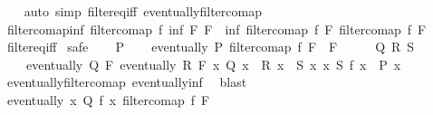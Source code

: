 \begin{isabellebody}
%
\isadelimproof
\ \ %
\endisadelimproof
%
\isatagproof
{}\isamarkupfalse%
\ {\isacharparenleft}{\kern0pt}auto\ simp{\isacharcolon}{\kern0pt}\ filter{\isacharunderscore}{\kern0pt}eq{\isacharunderscore}{\kern0pt}iff\ eventually{\isacharunderscore}{\kern0pt}filtercomap{\isacharparenright}{\kern0pt}%
\endisatagproof
{\isafoldproof}%
%
\isadelimproof
\isanewline
%
\endisadelimproof
\isanewline
{}\isamarkupfalse%
\ filtercomap{\isacharunderscore}{\kern0pt}inf{\isacharcolon}{\kern0pt}\ {\isachardoublequoteopen}filtercomap\ f\ {\isacharparenleft}{\kern0pt}inf\ F{}\ F{}{\isacharparenright}{\kern0pt}\ {\isacharequal}{\kern0pt}\ inf\ {\isacharparenleft}{\kern0pt}filtercomap\ f\ F{}{\isacharparenright}{\kern0pt}\ {\isacharparenleft}{\kern0pt}filtercomap\ f\ F{}{\isacharparenright}{\kern0pt}{\isachardoublequoteclose}\isanewline
%
\isadelimproof
\ \ %
\endisadelimproof
%
\isatagproof
{}\isamarkupfalse%
\ filter{\isacharunderscore}{\kern0pt}eq{\isacharunderscore}{\kern0pt}iff\isanewline
{}\isamarkupfalse%
\ safe\isanewline
\ \ \isamarkupfalse%
\ P\isanewline
\ \ \isamarkupfalse%
\ {\isachardoublequoteopen}eventually\ P\ {\isacharparenleft}{\kern0pt}filtercomap\ f\ {\isacharparenleft}{\kern0pt}F{}\ {\isasymsqinter}\ F{}{\isacharparenright}{\kern0pt}{\isacharparenright}{\kern0pt}{\isachardoublequoteclose}\isanewline
\ \ \isamarkupfalse%
\ \isamarkupfalse%
\ Q\ R\ S\ \ {\isacharasterisk}{\kern0pt}{\isacharcolon}{\kern0pt}\isanewline
\ \ \ \ {\isachardoublequoteopen}eventually\ Q\ F{}{\isachardoublequoteclose}\ {\isachardoublequoteopen}eventually\ R\ F{}{\isachardoublequoteclose}\ {\isachardoublequoteopen}{\isasymAnd}x{\isachardot}{\kern0pt}\ Q\ x\ {\isasymLongrightarrow}\ R\ x\ {\isasymLongrightarrow}\ S\ x{\isachardoublequoteclose}\ {\isachardoublequoteopen}{\isasymAnd}x{\isachardot}{\kern0pt}\ S\ {\isacharparenleft}{\kern0pt}f\ x{\isacharparenright}{\kern0pt}\ {\isasymLongrightarrow}\ P\ x{\isachardoublequoteclose}\isanewline
\ \ \ \ \isamarkupfalse%
\ eventually{\isacharunderscore}{\kern0pt}filtercomap\ eventually{\isacharunderscore}{\kern0pt}inf\ \isamarkupfalse%
\ blast\isanewline
\ \ \isamarkupfalse%
\ {\isacharasterisk}{\kern0pt}\ \isamarkupfalse%
\ {\isachardoublequoteopen}eventually\ {\isacharparenleft}{\kern0pt}{\isasymlambda}x{\isachardot}{\kern0pt}\ Q\ {\isacharparenleft}{\kern0pt}f\ x{\isacharparenright}{\kern0pt}{\isacharparenright}{\kern0pt}\ {\isacharparenleft}{\kern0pt}filtercomap\ f\ F{}{\isacharparenright}{\kern0pt}{\isachardoublequoteclose}\ \isanewline

\end{isabellebody}
